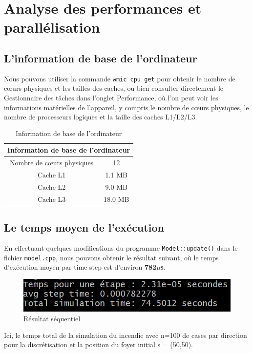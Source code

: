 \chapter{Analyse des performances et parallélisation}
\section{L'information de base de l'ordinateur}
Nous pouvons utiliser la commande \texttt{wmic cpu get} pour obtenir le nombre de cœurs physiques et les tailles des caches, ou bien consulter directement le Gestionnaire des tâches dans l'onglet Performance, où l'on peut voir les informations matérielles de l'appareil, y compris le nombre de cœurs physiques, le nombre de processeurs logiques et la taille des caches L1/L2/L3.

\begin{table}[h]
\centering
\begin{tabular}{|c|c|}
\hline
\multicolumn{2}{|c|}{Information de base de l'ordinateur} \\  
\hline
Nombre de cœurs physiques  & 12 \\  
\hline
Cache L1 & 1.1 MB \\  
\hline
Cache L2 & 9.0 MB \\  
\hline
Cache L3 & 18.0 MB\\  
\hline
\end{tabular}
\caption{Information de base de l'ordinateur}
\label{tab:instructions}
\end{table}

\section{Le temps moyen de l'exécution}
En effectuant quelques modifications du programme \texttt{Model::update()} dans le fichier \texttt{model.cpp}, nous pouvons obtenir le résultat suivant, où le temps d'exécution moyen par time step est d'environ \textbf{782$\mu$s}.
\begin{figure}[h]
    \centering
    \includegraphics[width=1.1\linewidth]{fig1.png}
    \caption{Résultat séquentiel}
    \label{fig:enter-label}
\end{figure}
Ici, le temps total de la simulation du incendie avec n=100 de cases par direction pour la discrétisation et la position du foyer initial s = (50,50).

